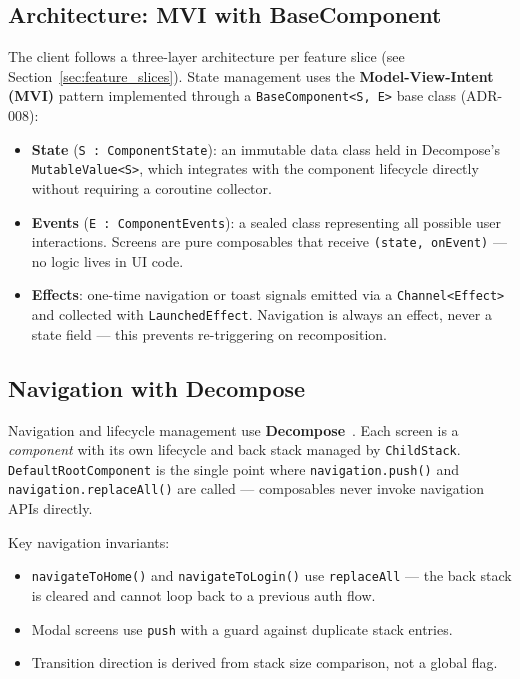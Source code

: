 \subsection{Architecture: MVI with BaseComponent}
\label{ssec:kmp_arch}

The client follows a three-layer architecture per feature slice (see Section~\ref{sec:feature_slices}). State management uses the \textbf{Model-View-Intent (MVI)} pattern implemented through a \texttt{BaseComponent<S, E>} base class (ADR-008):

\begin{itemize}
    \item \textbf{State} (\texttt{S : ComponentState}): an immutable data class held in Decompose's \texttt{MutableValue<S>}, which integrates with the component lifecycle directly without requiring a coroutine collector.
    \item \textbf{Events} (\texttt{E : ComponentEvents}): a sealed class representing all possible user interactions. Screens are pure composables that receive \texttt{(state, onEvent)} — no logic lives in UI code.
    \item \textbf{Effects}: one-time navigation or toast signals emitted via a \texttt{Channel<Effect>} and collected with \texttt{LaunchedEffect}. Navigation is always an effect, never a state field — this prevents re-triggering on recomposition.
\end{itemize}

\subsection{Navigation with Decompose}
\label{ssec:decompose}

Navigation and lifecycle management use \textbf{Decompose}~\cite{decompose2024}. Each screen is a \emph{component} with its own lifecycle and back stack managed by \texttt{ChildStack}. \texttt{DefaultRootComponent} is the single point where \texttt{navigation.push()} and \texttt{navigation.replaceAll()} are called — composables never invoke navigation APIs directly.

Key navigation invariants:
\begin{itemize}
    \item \texttt{navigateToHome()} and \texttt{navigateToLogin()} use \texttt{replaceAll} — the back stack is cleared and cannot loop back to a previous auth flow.
    \item Modal screens use \texttt{push} with a guard against duplicate stack entries.
    \item Transition direction is derived from stack size comparison, not a global flag.
\end{itemize}

